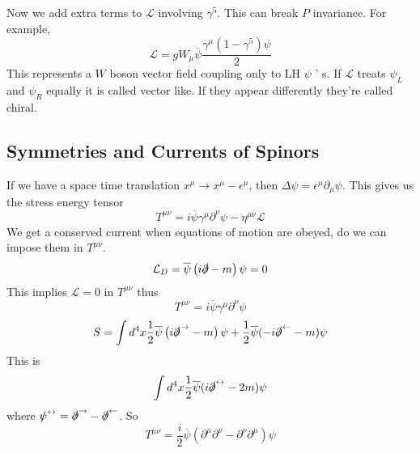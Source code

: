 Now we add extra terms to $ \mathcal{ L } $ involving $ \gamma ^ 5 $. This 
can break $ P $ invariance. For example, 
\begin{equation*}
		\mathcal{ L }  = g  W_ \mu \overline{\psi} \frac{ \gamma ^ \mu ( 1 - \gamma ^ 5 ) \psi }{ 2}
\end{equation*}
This represents a $ W $ boson vector field coupling only to LH $\psi$ ' s. 
If $\mathcal{ L }$ treats $\psi _ L$ and $\psi _ R$ equally it is called vector like. 
If they appear differently they're called chiral. 

\subsection{Symmetries and Currents of Spinors} 
If we have a space time translation $x ^ \mu \to x ^ \mu - \epsilon ^ \mu $, 
then  $ \Delta \psi  = \epsilon ^ \mu \partial  _ \mu \psi $. This 
gives us the stress energy tensor 
\[
 T ^{ \mu \nu }  = i \overline{ \psi } \gamma ^ \mu \partial  ^ \nu \psi - \eta ^{ \mu \nu } \mathcal{ L }
\] We get a conserved current when equations of motion 
are obeyed, do we can impose them in $ T ^{ \mu \nu } $. 
\[
	\mathcal{ L } _ D = \overline{ \psi } \left(  
	i \slashed{\partial} - m \right)  \psi  = 0 
\] This implies $ \mathcal{ L }  = 0 $ in $ T ^{ \mu \nu } $ thus 
\[
 T ^{ \mu \nu } = i \overline{ \psi } \gamma ^ \mu \partial  ^ \nu \psi 
\] 
\[
	S = \int  d^ 4 x \frac{1}{ 2 } \overline{ \psi } \left(  i \slashed{\partial}^{ \rightarrow}
	- m \right)  \psi + \frac{1}{2 } \overline{ \psi } ( - i \slashed{\partial} ^{ \leftarrow } - m ) \psi 
\] This is 
\[
	\int d ^ 4 x \frac{1}{2 } \overline{ \psi } ( i \slashed {\partial} ^{ \leftrightarrow} - 2m ) \psi 
\]  where $\slashed{\psi} ^{ \leftrightarrow }  = \slashed{\partial} ^ \rightarrow - \slashed{\partial} ^ 
\leftarrow $. So
\[
	T ^{ \mu \nu }  = \frac{ i }{ 2} \overline{ \psi } ( \partial  ^ \mu \partial  ^ \nu - \partial  ^ \nu \partial  ^ \mu ) \psi 
\]

